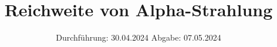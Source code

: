

\subject{V701}
\title{Reichweite von Alpha-Strahlung}
\date{%
  Durchführung: 30.04.2024
  \hspace{3em}
  Abgabe: 07.05.2024
}



\maketitle
\thispagestyle{empty}
\tableofcontents
\newpage






\printbibliography{}
\appendix
\setcounter{secnumdepth}{0}

